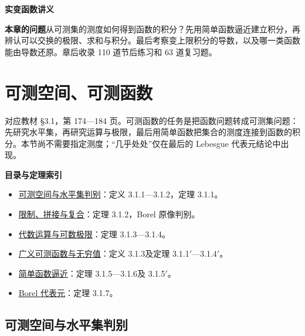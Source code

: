\documentclass[11pt,a4paper]{article}
\providecommand{\tightlist}{\setlength{\itemsep}{3pt}\setlength{\parskip}{0pt}}
\begin{document}
\begin{center}
{\LARGE\bfseries 实变函数讲义\par}
\vspace{8pt}{\large 第三章\quad 积分理论\par}
\vspace{6pt}{\small 依徐森林、薛春华《实变函数论》\quad 教材第 174—379 页\par}
\end{center}
\vspace{8pt}
\noindent\textbf{本章的问题}\quad 从可测集的测度如何得到函数的积分？先用简单函数逼近建立积分，再辨认可以交换的极限、求和与积分。最后考察变上限积分的导数，以及哪一类函数能由导数还原。章后收录 110 道节后练习和 63 道复习题。
\tableofcontents\clearpage

\section{可测空间、可测函数}
对应教材 §3.1，第 174---184
页。可测函数的任务是把函数问题转成可测集问题：先研究水平集，再研究运算与极限，最后用简单函数把集合的测度连接到函数的积分。本节尚不需要指定测度；``几乎处处''仅在最后的
Lebesgue 代表元结论中出现。

\textbf{目录与定理索引}

\begin{itemize}
\tightlist
\item
  \hyperref[ux53efux6d4bux7a7aux95f4ux4e0eux6c34ux5e73ux96c6ux5224ux522b]{可测空间与水平集判别}：定义
  3.1.1---3.1.2，定理 3.1.1。
\item
  \hyperref[ux9650ux5236ux62fcux63a5ux4e0eux590dux5408]{限制、拼接与复合}：定理
  3.1.2，Borel 原像判别。
\item
  \hyperref[ux4ee3ux6570ux8fd0ux7b97ux4e0eux53efux6570ux6781ux9650]{代数运算与可数极限}：定理
  3.1.3---3.1.4。
\item
  \hyperref[ux5e7fux4e49ux53efux6d4bux51fdux6570ux4e0eux65e0ux7a77ux503c]{广义可测函数与无穷值}：定义
  3.1.3及定理 3.1.1\ensuremath{'}---3.1.4\ensuremath{'}。
\item
  \hyperref[ux7b80ux5355ux51fdux6570ux903cux8fd1]{简单函数逼近}：定理
  3.1.5---3.1.6及 3.1.5\ensuremath{'}。
\item
  \hyperref[borel-ux4ee3ux8868ux5143]{Borel 代表元}：定理 3.1.7。
\end{itemize}

\subsection*{可测空间与水平集判别}\label{ux53efux6d4bux7a7aux95f4ux4e0eux6c34ux5e73ux96c6ux5224ux522b}
\end{document}
